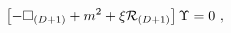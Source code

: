 \begin{equation}
    \left[-\Box_{(D+1)} +m^2+ \xi {\cal R}_{(D+1)}\right]
    \Upsilon =0~,
\label{eq3}
\end{equation}

